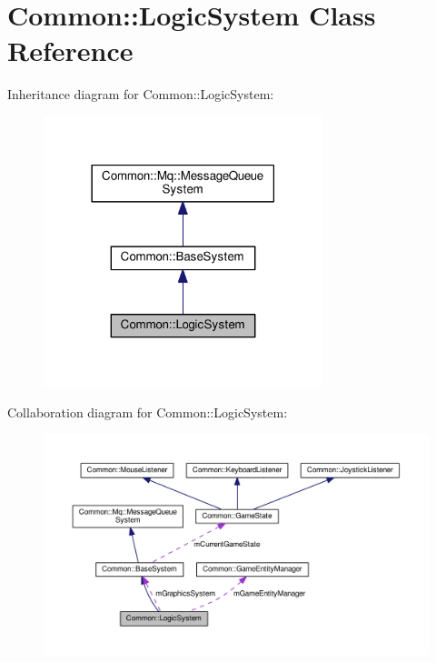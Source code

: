 \hypertarget{class_common_1_1_logic_system}{}\section{Common\+:\+:Logic\+System Class Reference}
\label{class_common_1_1_logic_system}


Inheritance diagram for Common\+:\+:Logic\+System\+:\nopagebreak
\begin{figure}[H]
\begin{center}
\leavevmode
\includegraphics[width=230pt]{class_common_1_1_logic_system__inherit__graph}
\end{center}
\end{figure}


Collaboration diagram for Common\+:\+:Logic\+System\+:\nopagebreak
\begin{figure}[H]
\begin{center}
\leavevmode
\includegraphics[width=350pt]{class_common_1_1_logic_system__coll__graph}
\end{center}
\end{figure}

